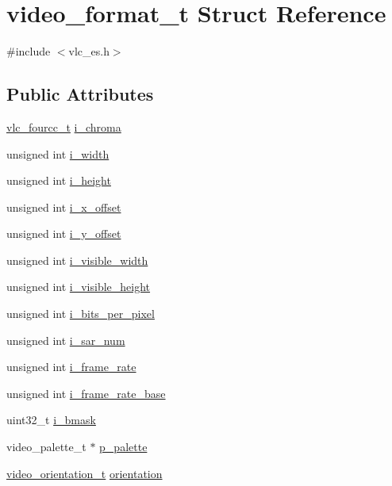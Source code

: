 \hypertarget{structvideo__format__t}{}\section{video\+\_\+format\+\_\+t Struct Reference}
\label{structvideo__format__t}


{\ttfamily \#include $<$vlc\+\_\+es.\+h$>$}

\subsection*{Public Attributes}
\begin{DoxyCompactItemize}
\item 
\hyperlink{vlc__common_8h_af49f89d0f752bc9cff142e43b1bd634d}{vlc\+\_\+fourcc\+\_\+t} \hyperlink{structvideo__format__t_af7092641925ebcc3cab85ffdfa420f03}{i\+\_\+chroma}
\item 
unsigned int \hyperlink{structvideo__format__t_ab1f5cd056eac458e313cf2e9ac4da850}{i\+\_\+width}
\item 
unsigned int \hyperlink{structvideo__format__t_a0c3e35aee3ae2c152b723670d65abccd}{i\+\_\+height}
\item 
unsigned int \hyperlink{structvideo__format__t_aa745c2cf3cade8293da8eef8582eb324}{i\+\_\+x\+\_\+offset}
\item 
unsigned int \hyperlink{structvideo__format__t_a11f9b4658f3b8c4008e37b44344fffd1}{i\+\_\+y\+\_\+offset}
\item 
unsigned int \hyperlink{structvideo__format__t_a178b5516a0902c107eae17821221e894}{i\+\_\+visible\+\_\+width}
\item 
unsigned int \hyperlink{structvideo__format__t_ab695dbed05343378b276bc8a2d47f1d6}{i\+\_\+visible\+\_\+height}
\item 
unsigned int \hyperlink{structvideo__format__t_affc5b9a03b78c3ecece40660b63ea09d}{i\+\_\+bits\+\_\+per\+\_\+pixel}
\item 
unsigned int \hyperlink{structvideo__format__t_ad8f9d08ea3b0e6b05a02a955f0967db8}{i\+\_\+sar\+\_\+num}
\item 
unsigned int \hyperlink{structvideo__format__t_a34e41fd895f8726ed1d49377c51a8d8a}{i\+\_\+frame\+\_\+rate}
\item 
unsigned int \hyperlink{structvideo__format__t_ada76741ebdf6c57fb7381fc8bce5678b}{i\+\_\+frame\+\_\+rate\+\_\+base}
\item 
uint32\+\_\+t \hyperlink{structvideo__format__t_a9769fc19641aaf059f6ecaf879a65de3}{i\+\_\+bmask}
\item 
video\+\_\+palette\+\_\+t $\ast$ \hyperlink{structvideo__format__t_a69ac38b3e5159bd1622d29372972eaa1}{p\+\_\+palette}
\item 
\hyperlink{vlc__es_8h_a1a6878c41244a468be3869ca422934a4}{video\+\_\+orientation\+\_\+t} \hyperlink{structvideo__format__t_a437fe07cfa0bad59e9003a0f1f51fac5}{orientation}
\end{DoxyCompactItemize}


